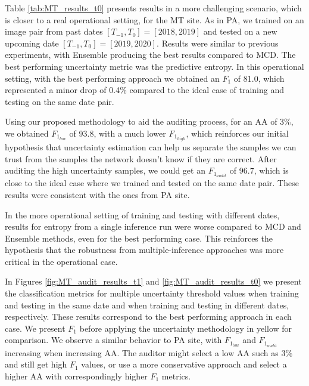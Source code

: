Table \ref{tab:MT_results_t0} presents results in a more challenging scenario, which is closer to a real operational setting, for the MT site. As in PA, we trained on an image pair from past dates $[T_{-1}, T_0] = [2018, 2019]$ and tested on a new upcoming date $[T_{-1}, T_0] = [2019, 2020]$.  Results were similar to previous experiments, with Ensemble producing the best results compared to MCD. The best performing uncertainty metric was the predictive entropy. In this operational setting, with the best performing approach we obtained an $F_1$ of 81.0, which represented a minor drop of 0.4\% compared to the ideal case of training and testing on the same date pair. 

Using our proposed methodology to aid the auditing process, for an AA of 3\%, we obtained $F_{1_{low}}$ of 93.8, with a much lower $F_{1_{high}}$, which reinforces our initial hypothesis that uncertainty estimation can help us separate the samples we can trust from the samples the network doesn't know if they are correct. After auditing the high uncertainty samples, we could get an $F_{1_{audit}}$ of 96.7, which is close to the ideal case where we trained and tested on the same date pair. These results were consistent with the ones from PA site.

In the more operational setting of training and testing with different dates, results for entropy from a single inference run were worse compared to MCD and Ensemble methods, even for the best performing case. This reinforces the hypothesis that the robustness from multiple-inference approaches was more critical in the operational case.

In Figures \ref{fig:MT_audit_results_t1} and \ref{fig:MT_audit_results_t0} we present the classification metrics for multiple uncertainty threshold values when training and testing in the same date and when training and testing in different dates, respectively. These results correspond to the best performing approach in each case. We present $F_1$ before applying the uncertainty methodology in yellow for comparison. We observe a similar behavior to PA site, with $F_{1_{low}}$ and $F_{1_{audit}}$ increasing when increasing AA. The auditor might select a low AA such as 3\% and still get high $F_1$ values, or use a more conservative approach and select a higher AA with correspondingly higher $F_1$ metrics.

